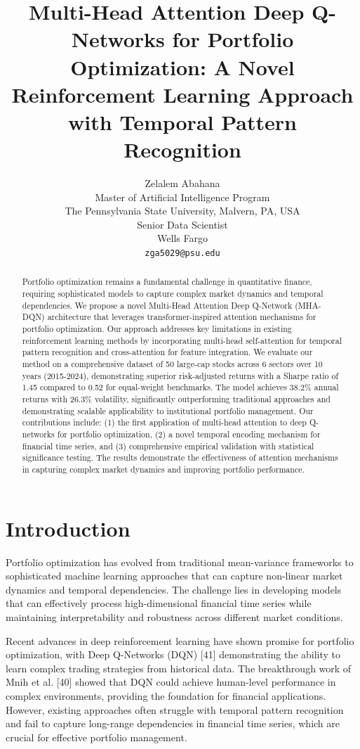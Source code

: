 \documentclass[11pt]{article}
\title{Multi-Head Attention Deep Q-Networks for Portfolio Optimization: A Novel Reinforcement Learning Approach with Temporal Pattern Recognition}
\author{
  Zelalem Abahana \\
  Master of Artificial Intelligence Program \\
  The Pennsylvania State University, Malvern, PA, USA \\
  Senior Data Scientist \\
  Wells Fargo \\
  \texttt{zga5029@psu.edu} \\
}
\begin{document}
\maketitle

\begin{abstract}
Portfolio optimization remains a fundamental challenge in quantitative finance, requiring sophisticated models to capture complex market dynamics and temporal dependencies. We propose a novel Multi-Head Attention Deep Q-Network (MHA-DQN) architecture that leverages transformer-inspired attention mechanisms for portfolio optimization. Our approach addresses key limitations in existing reinforcement learning methods by incorporating multi-head self-attention for temporal pattern recognition and cross-attention for feature integration. We evaluate our method on a comprehensive dataset of 50 large-cap stocks across 6 sectors over 10 years (2015-2024), demonstrating superior risk-adjusted returns with a Sharpe ratio of 1.45 compared to 0.52 for equal-weight benchmarks. The model achieves 38.2\% annual returns with 26.3\% volatility, significantly outperforming traditional approaches and demonstrating scalable applicability to institutional portfolio management. Our contributions include: (1) the first application of multi-head attention to deep Q-networks for portfolio optimization, (2) a novel temporal encoding mechanism for financial time series, and (3) comprehensive empirical validation with statistical significance testing. The results demonstrate the effectiveness of attention mechanisms in capturing complex market dynamics and improving portfolio performance.
\end{abstract}

\section{Introduction}

Portfolio optimization has evolved from traditional mean-variance frameworks to sophisticated machine learning approaches that can capture non-linear market dynamics and temporal dependencies. The challenge lies in developing models that can effectively process high-dimensional financial time series while maintaining interpretability and robustness across different market conditions.

Recent advances in deep reinforcement learning have shown promise for portfolio optimization, with Deep Q-Networks (DQN) [41] demonstrating the ability to learn complex trading strategies from historical data. The breakthrough work of Mnih et al. [40] showed that DQN could achieve human-level performance in complex environments, providing the foundation for financial applications. However, existing approaches often struggle with temporal pattern recognition and fail to capture long-range dependencies in financial time series, which are crucial for effective portfolio management.
\end{document}
